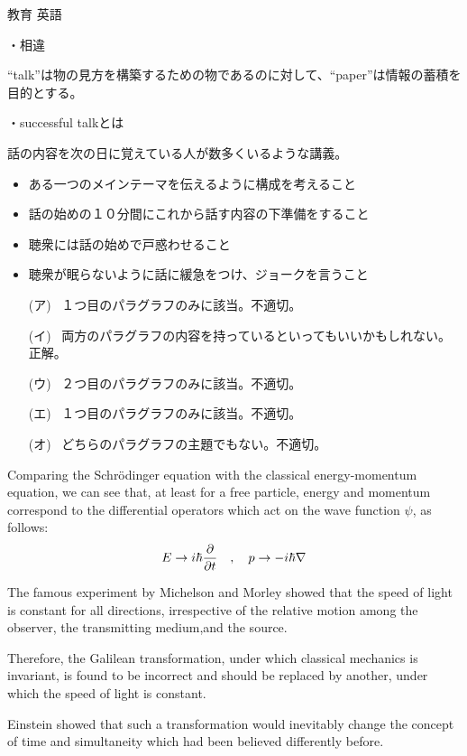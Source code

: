 \documentclass[fleqn]{jbook}
\begin{document}
\begin{answer}{教育 英語}{}
\begin{subanswers}
\begin{subsubanswers}
\SubSubAnswer
・相違

``talk''は物の見方を構築するための物であるのに対して、``paper''は情報の蓄積を目的とする。

・successful talkとは

話の内容を次の日に覚えている人が数多くいるような講義。

\SubSubAnswer
\begin{itemize}
\item ある一つのメインテーマを伝えるように構成を考えること
\item 話の始めの１０分間にこれから話す内容の下準備をすること
\item 聴衆には話の始めで戸惑わせること
\item 聴衆が眠らないように話に緩急をつけ、ジョークを言うこと
\end{itemize}

\SubSubAnswer
\begin{itemize}
\item[(ア)]\ １つ目のパラグラフのみに該当。不適切。
\item[(イ)]\ 両方のパラグラフの内容を持っているといってもいいかもしれない。正解。
\item[(ウ)]\ ２つ目のパラグラフのみに該当。不適切。
\item[(エ)]\ １つ目のパラグラフのみに該当。不適切。
\item[(オ)]\ どちらのパラグラフの主題でもない。不適切。
\end{itemize}

\end{subsubanswers}

\SubAnswer
\begin{subsubanswers}
\baselineskip=12pt
\SubSubAnswer
Comparing the Schr\"{o}dinger equation with the classical energy-momentum equation, we can see that, at least for a free particle, energy and momentum correspond to the differential operators which act on the wave function $\psi$, as follows:
\[
E \to i\hbar \frac{\partial}{\partial t} \quad,\quad p \to -i\hbar \nabla
\]

\SubSubAnswer
The famous experiment by Michelson and Morley showed that the speed of light is constant for all directions, irrespective of the relative motion among the observer, the transmitting medium,and the source.

\SubSubAnswer
Therefore, the Galilean transformation, under which classical mechanics is invariant, is found to be incorrect and should be replaced by another, under which the speed of light is constant.

\SubSubAnswer
Einstein showed that such a transformation would inevitably change the concept of time and simultaneity which had been believed differently before.
\baselineskip=15pt
\end{subsubanswers}
\end{subanswers}
\end{answer}
\end{document}
